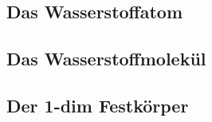 \subsection{Das Wasserstoffatom}
\label{sec:d_H}



\subsection{Das Wasserstoffmolekül}
\label{sec:d_H2}



\subsection{Der 1-dim Festkörper}
\label{sec:d_fk}